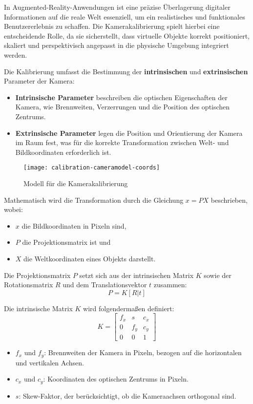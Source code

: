 In Augmented-Reality-Anwendungen ist eine präzise Überlagerung digitaler Informationen auf die reale Welt essenziell, um ein realistisches und funktionales Benutzererlebnis zu schaffen. Die Kamerakalibrierung spielt hierbei eine entscheidende Rolle, da sie sicherstellt, dass virtuelle Objekte korrekt positioniert, skaliert und perspektivisch angepasst in die physische Umgebung integriert werden.

Die Kalibrierung umfasst die Bestimmung der \textbf{intrinsischen} und \textbf{extrinsischen} Parameter der Kamera:

\begin{itemize}
    \item \textbf{Intrinsische Parameter} beschreiben die optischen Eigenschaften der Kamera, wie Brennweiten, Verzerrungen und die Position des optischen Zentrums.
    \item \textbf{Extrinsische Parameter} legen die Position und Orientierung der Kamera im Raum fest, was für die korrekte Transformation zwischen Welt- und Bildkoordinaten erforderlich ist.
\end{itemize}

\begin{figure}
    \centering
    \texttt{[image: calibration-cameramodel-coords]}
    \caption{Modell für die Kamerakalibrierung\label{fig:Kalibrierung}}\par
\end{figure}

Mathematisch wird die Transformation durch die Gleichung \( x = PX \) beschrieben, wobei:

\begin{itemize}
    \item \( x \) die Bildkoordinaten in Pixeln sind,
    \item \( P \) die Projektionsmatrix ist und
    \item \( X \) die Weltkoordinaten eines Objekts darstellt.
\end{itemize}

Die Projektionsmatrix \( P \) setzt sich aus der intrinsischen Matrix \( K \) sowie der Rotationsmatrix \( R \) und dem Translationsvektor \( t \) zusammen:
\[
P = K[R|t]
\]

Die intrinsische Matrix \( K \) wird folgendermaßen definiert:
\[
K = 
\begin{bmatrix}
f_x & s & c_x \\
0 & f_y & c_y \\
0 & 0 & 1
\end{bmatrix}
\]
\begin{itemize}
    \item \( f_x \) und \( f_y \): Brennweiten der Kamera in Pixeln, bezogen auf die horizontalen und vertikalen Achsen.
    \item \( c_x \) und \( c_y \): Koordinaten des optischen Zentrums in Pixeln.
    \item \( s \): Skew-Faktor, der berücksichtigt, ob die Kameraachsen orthogonal sind.
\end{itemize}

